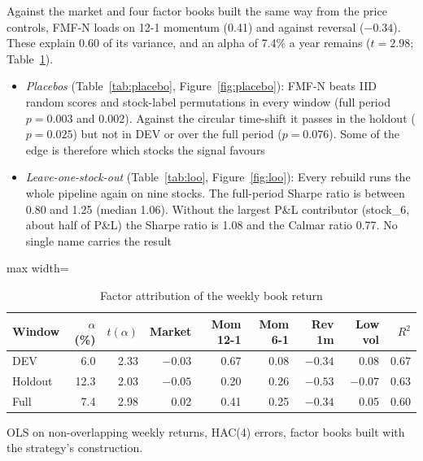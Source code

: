Against the market and four factor books built the same way from the price controls, FMF-N loads on 12-1 momentum (0.41) and against reversal ($-0.34$). These explain 0.60 of its variance, and an alpha of 7.4\% a year remains ($t = 2.98$; Table~\ref{tab:attrib}).
\begin{itemize}
  \item \emph{Placebos} (Table~\ref{tab:placebo}, Figure~\ref{fig:placebo}): FMF-N beats IID random scores and stock-label permutations in every window (full period $p = 0.003$ and $0.002$). Against the circular time-shift it passes in the holdout ($p = 0.025$) but not in DEV or over the full period ($p = 0.076$). Some of the edge is therefore which stocks the signal favours
  \item \emph{Leave-one-stock-out} (Table~\ref{tab:loo}, Figure~\ref{fig:loo}): Every rebuild runs the whole pipeline again on nine stocks. The full-period Sharpe ratio is between 0.80 and 1.25 (median 1.06). Without the largest P\&L contributor (stock\_6, about half of P\&L) the Sharpe ratio is 1.08 and the Calmar ratio 0.77. No single name carries the result
\end{itemize}

\begin{table}[t]
\centering\small
\caption{Factor attribution of the weekly book return}\label{tab:attrib}
\begin{adjustbox}{max width=\textwidth}\begin{tabular}{lrrrrrrrr}
\toprule
Window & $\alpha$ (\%) & $t(\alpha)$ & Market & Mom 12-1 & Mom 6-1 & Rev 1m & Low vol & $R^2$\\
\midrule
DEV & 6.0 & 2.33 & $-0.03$ & 0.67 & 0.08 & $-0.34$ & 0.08 & 0.67\\
Holdout & 12.3 & 2.03 & $-0.05$ & 0.20 & 0.26 & $-0.53$ & $-0.07$ & 0.63\\
Full & 7.4 & 2.98 & 0.02 & 0.41 & 0.25 & $-0.34$ & 0.05 & 0.60\\
\bottomrule
\end{tabular}\end{adjustbox}
\par\smallskip\begin{minipage}{0.9\textwidth}\footnotesize OLS on non-overlapping weekly returns, HAC(4) errors, factor books built with the strategy's construction.\end{minipage}
\end{table}


